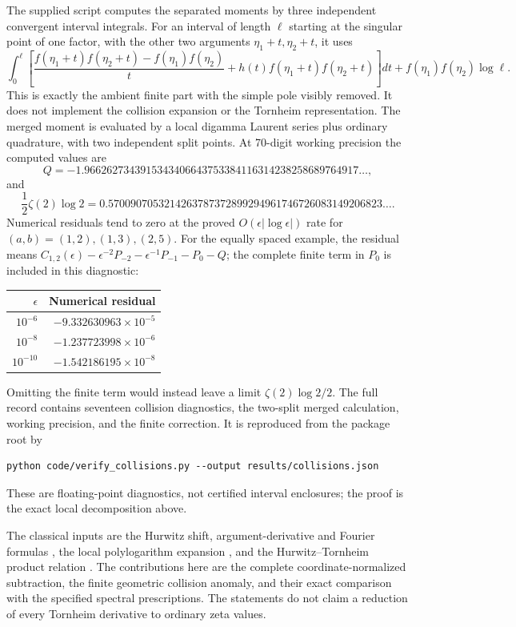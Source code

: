 The supplied script  computes the
separated moments by three independent convergent interval integrals.
For an interval of length $\ell$ starting at the singular point of one
factor, with the other two arguments $\eta_1+t,\eta_2+t$, it uses
\[
 \int_0^\ell\left[
 \frac{f(\eta_1+t)f(\eta_2+t)-f(\eta_1)f(\eta_2)}{t}
 +h(t)f(\eta_1+t)f(\eta_2+t)\right]dt
 +f(\eta_1)f(\eta_2)\log\ell.
\]
This is exactly the ambient finite part with the simple pole visibly
removed. It does not implement the collision expansion or the
Tornheim representation. The merged moment is evaluated by a local
digamma Laurent series plus ordinary quadrature, with two independent
split points. At 70-digit working precision the computed values are
\[
 Q=-1.9662627343915343406643753384116314238258689764917\ldots,
\]
and
\[
 \frac12\zeta(2)\log2=0.5700907053214263787372899294961746726083149206823\ldots.
\]
Numerical residuals tend to zero at the proved
$O(\epsilon|\log\epsilon|)$ rate for $(a,b)=(1,2),(1,3),(2,5)$.
For the equally spaced example, the residual means
$C_{1,2}(\epsilon)-\epsilon^{-2}P_{-2}
 -\epsilon^{-1}P_{-1}-P_0-Q$; the complete finite term in $P_0$
is included in this diagnostic:
\begin{center}
\begin{tabular}{@{}rr@{}}
\toprule
$\epsilon$ & Numerical residual\\
\midrule
$10^{-6}$ & $-9.332630963\times10^{-5}$\\
$10^{-8}$ & $-1.237723998\times10^{-6}$\\
$10^{-10}$ & $-1.542186195\times10^{-8}$\\
\bottomrule
\end{tabular}
\end{center}
Omitting the finite term would instead leave a limit
$\zeta(2)\log2/2$. The full record contains seventeen collision
diagnostics, the two-split merged calculation, working precision,
and the finite correction. It is reproduced from the package root by
\begin{verbatim}
python code/verify_collisions.py --output results/collisions.json
\end{verbatim}
These are floating-point diagnostics, not certified interval enclosures;
the proof is the exact local decomposition above.

The classical inputs are the Hurwitz shift, argument-derivative and
Fourier formulas \cite{DLMFHurwitz}, the local polylogarithm expansion
\cite{DLMFPolylog}, and the Hurwitz--Tornheim product relation
\cite{EspinosaMoll}. The contributions here are the complete
coordinate-normalized subtraction, the finite geometric collision
anomaly, and their exact comparison with the specified spectral
prescriptions. The statements do not claim a reduction of every
Tornheim derivative to ordinary zeta values.
